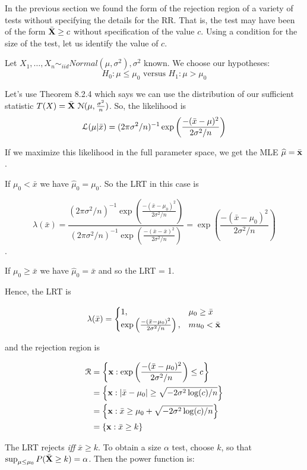 \documentclass[11pt,]{article}
\def\bx{{\bf x}}
\def\bX{{\bf X}}
\def\muhat{{\widehat\mu}}
\def\xbar{\bar{ x}}
\def\bxbar{\bar{ \bx}}
\def\bXbar{\bar{ \bX}}
\def\Lsc{{\cal L}}
\def\Nsc{{\cal N}}
\def\Rsc{{\cal R}}
\def\bxbar{\bar{\bx}}
\begin{document}
In the previous section we found the form of the rejection region of a
variety of tests without specifying the details for the RR. That is, the
test may have been of the form \(\bXbar \geq c\) without specification
of the value \(c\). Using a condition for the size of the test, let us
identify the value of \(c\).

 Let
\(X_1, \ldots, X_n \sim_{iid} Normal(\mu, \sigma^2), \sigma^2\) known.
We choose our hypotheses:
\[H_0: \mu \leq \mu_0 \mbox{ versus } H_1: \mu > \mu_0\]

Let's use Theorem 8.2.4 which says we can use the distribution of our
sufficient statistic \(T(X) = \bXbar ~ \Nsc(\mu, \frac{\sigma^2}{n})\).
So, the likelihood is
\[\Lsc(\mu | \xbar) = (2\pi\sigma^2/n)^{-1} \exp\left(\frac{-(\xbar-\mu)^2}{2\sigma^2/n}\right)\]

If we maximize this likelihood in the full parameter space, we get the
MLE \(\muhat = \bxbar\).

If \(\mu_0 < \xbar\) we have \(\muhat_0 = \mu_0\). So the LRT in this
case is

\[\lambda(\xbar) = \frac{(2\pi\sigma^2/n)^{-1} \exp\left(\frac{-(\xbar-\mu_0)^2}{2\sigma^2/n}\right)}{(2\pi\sigma^2/n)^{-1} \exp\left(\frac{-(\xbar-\xbar)^2}{2\sigma^2/n}\right)} = 
\exp\left(\frac{-(\xbar-\mu_0)^2}{2\sigma^2/n}\right)\].

If \(\mu_0 \geq \xbar\) we have \(\muhat_0 = \xbar\) and so the LRT = 1.

Hence, the LRT is

\[\lambda(\xbar) = \begin{cases}
1, & \mu_0 \geq \xbar\\
\exp\left(\frac{-(\xbar-\mu_0)^2}{2\sigma^2/n}\right), & mu_0 < \bxbar
\end{cases}
\]

and the rejection region is

\begin{align*}
\Rsc &= \left\{\bx : \exp\left(\frac{-(\xbar-\mu_0)^2}{2\sigma^2/n}\right) \leq c\right\}\\
&=\left\{\bx : |\xbar-\mu_0| \geq \sqrt{-2\sigma^2\log(c)/n}\right\}\\
&= \left\{\bx : \xbar \geq \mu_0 + \sqrt{-2\sigma^2\log(c)/n}\right\}\\
&= \left\{\bx: \xbar \geq k\right\}
\end{align*}

The LRT rejects \emph{iff} \(\xbar \geq k\). To obtain a size \(\alpha\)
test, choose \(k\), so that
\(\sup_{\mu \leq \mu_0} P(\bXbar \geq k) = \alpha\). Then the power
function is:
\end{document}
